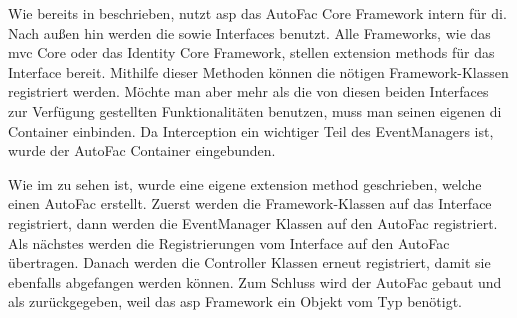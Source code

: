 

Wie bereits in  beschrieben, nutzt \gls{asp} das AutoFac Core Framework intern für \gls{di}. Nach außen hin werden die  sowie  Interfaces benutzt. Alle Frameworks, wie \zB das \gls{mvc} Core oder das Identity Core Framework, stellen extension methods für das  Interface bereit. Mithilfe dieser Methoden können die nötigen Framework-Klassen registriert werden. Möchte man aber mehr als die von diesen beiden Interfaces zur Verfügung gestellten Funktionalitäten benutzen, muss man seinen eigenen \gls{di} Container einbinden. Da Interception ein wichtiger Teil des EventManagers ist, wurde der AutoFac Container eingebunden.


Wie im  zu sehen ist, wurde eine eigene extension method geschrieben, welche einen AutoFac  erstellt. Zuerst werden die Framework-Klassen auf das  Interface registriert, dann werden die EventManager Klassen auf den AutoFac  registriert. Als nächstes werden die Registrierungen vom  Interface auf den AutoFac  übertragen. Danach werden die Controller Klassen erneut registriert, damit sie ebenfalls abgefangen werden können. Zum Schluss wird der AutoFac  gebaut und als  zurückgegeben, weil das \gls{asp} Framework ein Objekt vom Typ  benötigt.
